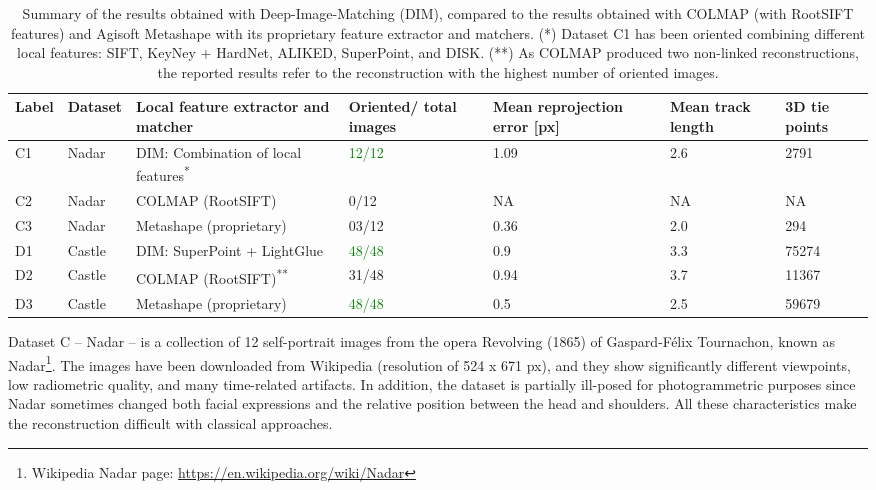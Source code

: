 \begin{table}[ht]
    \centering
    \caption{Summary of the results obtained with Deep-Image-Matching (DIM), compared to the results obtained with COLMAP (with RootSIFT features) and Agisoft Metashape with its proprietary feature extractor and matchers. (*) Dataset C1 has been oriented combining different local features: SIFT, KeyNey + HardNet, ALIKED, SuperPoint, and DISK.  (**) As COLMAP produced two non-linked reconstructions, the reported results refer to the reconstruction with the highest number of oriented images.} 
    \label{tab:5:statistics_summary}
    
    \begin{tabular}{l p{1cm} p{4cm} p{1.5cm} p{1.5cm} p{1.5cm} p{1.5cm}}
    \toprule
    \textbf{Label} & \textbf{Dataset} & \textbf{Local feature extractor and matcher} & \textbf{Oriented/} \newline\textbf{total images} & \textbf{Mean reprojection error [px]} & \textbf{Mean track length} &  \textbf{3D tie points}\\
    \midrule
    C1  & Nadar     & DIM: Combination of local features\textsuperscript{*}    & \textcolor{green}{12/12}     & 1.09  & 2.6   & 2791 \\
    C2  & Nadar     & COLMAP (RootSIFT)                     & 0/12      & NA    & NA    & NA   \\
    C3  & Nadar     & Metashape (proprietary)               & 03/12     & 0.36  & 2.0   & 294  \\ \hline
    D1  & Castle    & DIM: SuperPoint + LightGlue           & \textcolor{green}{48/48}     & 0.9   & 3.3   & 75274 \\
    D2  & Castle    & COLMAP (RootSIFT)\textsuperscript{**} & 31/48     & 0.94  & 3.7   & 11367 \\
    D3  & Castle    & Metashape (proprietary)               & \textcolor{green}{48/48}     & 0.5   & 2.5   & 59679 \\ 
    \bottomrule
    \end{tabular}
\end{table}

Dataset C – Nadar – is a collection of 12 self-portrait images from the opera Revolving (1865) of Gaspard-Félix Tournachon, known as Nadar\footnote{Wikipedia Nadar page: \url{https://en.wikipedia.org/wiki/Nadar}}. 
The images have been downloaded from Wikipedia (resolution of 524 x 671 px), and they show significantly different viewpoints, low radiometric quality, and many time-related artifacts. 
In addition, the dataset is partially ill-posed for photogrammetric purposes since Nadar sometimes changed both facial expressions and the relative position between the head and shoulders. 
All these characteristics make the reconstruction difficult with classical approaches.

